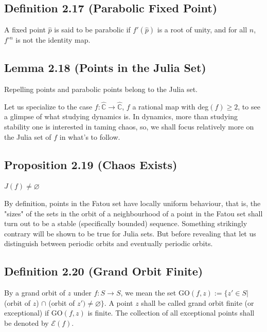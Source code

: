 \documentclass[11pt,a4paper]{article}
\begin{document}
        \subsection*{Definition 2.17 (Parabolic Fixed Point)} A fixed point $\hat{p}$ is said to be parabolic if $f'(\hat{p})$ is a root of unity, and  for all $n$, $f^{\circ n}$ is not the identity map.


        \subsection*{Lemma 2.18 (Points in the Julia Set)}  Repelling points and parabolic points belong to the Julia set.



        Let us specialize to the case $f: \hat{\mathbb{C}}\rightarrow \hat{\mathbb{C}}$, $f$ a rational map with deg$(f) \geq 2$, to see a glimpse of what studying dynamics is. In dynamics, more than studying stability one is interested in taming chaos, so, we shall focus relatively more on the Julia set of $f$ in what's to follow.

        \subsection*{Proposition 2.19 (Chaos Exists)} $J(f) \neq \varnothing$


        By definition, points in the Fatou set have locally uniform behaviour, that is, the "sizes" of the sets in the orbit of a neighbourhood of a point in the Fatou set shall turn out to be a stable (specifically bounded) sequence. Something strikingly contrary will be shown to be true for Julia sets. But before revealing that let us distinguish between periodic orbits and eventually periodic orbits.
        \subsection*{Definition 2.20 (Grand Orbit Finite)} By a grand orbit of $z$ under $f: S \rightarrow S$, we mean the set GO$(f, z) := \{z' \in S|$ (orbit of $z$) $\cap$ (orbit of $z') \neq \varnothing\}$. A point $z$ shall be called grand orbit finite (or exceptional) if GO$(f, z)$ is finite. The collection of all exceptional points shall be denoted by $\mathcal{E}(f)$.
\end{document}

